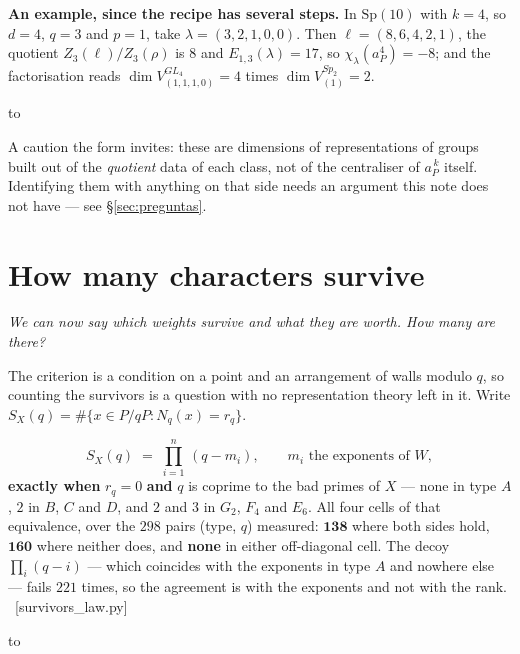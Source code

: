 \documentclass[11pt,a4paper]{article}
\theoremstyle{definition}
\newcommand{\Sp}{\mathrm{Sp}}
\newcommand{\ver}[1]{\unskip\penalty0\ \textcolor{azul}{\small\textsf{[#1]}}}
\newenvironment{keybox}
  {\par\vspace{9pt}\begin{lrbox}{\fichabox}%
   \begin{minipage}{0.90\textwidth}\vspace{7pt}\setlength{\parskip}{3pt}}
  {\vspace{7pt}\end{minipage}\end{lrbox}%
   \par\noindent\hbox to \textwidth{\hfill
   \textcolor{azul}{\rule[-\dp\fichabox]{3.2pt}{\dimexpr\ht\fichabox+\dp\fichabox\relax}}%
   \colorbox{fondoficha}{\usebox{\fichabox}}\hfill}%
   \par\vspace{9pt}}
\begin{document}
\begin{keybox}
\textbf{An example, since the recipe has several steps.} In $\Sp(10)$ with $k=4$, so $d=4$, $q=3$
and $p=1$, take $\lambda=(3,2,1,0,0)$. Then $\ell=(8,6,4,2,1)$, the quotient $Z_3(\ell)/Z_3(\rho)$ is
$8$ and $E_{1,3}(\lambda)=17$, so $\chi_\lambda(a_P^4)=-8$; and the factorisation reads
$\dim V^{GL_4}_{(1,1,1,0)}=4$ times $\dim V^{Sp_2}_{(1)}=2$.
\end{keybox}

\noindent A caution the form invites: these are dimensions of representations of groups built out of
the \emph{quotient} data of each class, not of the centraliser of $a_P^{\,k}$ itself. Identifying
them with anything on that side needs an argument this note does not have --- see
\S\ref{sec:preguntas}.

\section{How many characters survive}\label{sec:cuenta}

\noindent\emph{We can now say which weights survive and what they are worth. How many are there?}

The criterion is a condition on a point and an arrangement of walls modulo $q$, so counting the
survivors is a question with no representation theory left in it. Write
$S_X(q)=\#\{x\in P/qP: N_q(x)=r_q\}$.


\begin{keybox}
\[
S_X(q)\;=\;\prod_{i=1}^{n}\,(q-m_i),\qquad m_i \text{ the exponents of } W,
\]
\textbf{exactly when} $r_q=0$ \textbf{and} $q$ is coprime to the bad primes of $X$ --- none in type
$A$, $2$ in $B$, $C$ and $D$, and $2$ and $3$ in $G_2$, $F_4$ and $E_6$. All four cells of that
equivalence, over the $298$ pairs (type, $q$) measured: $\mathbf{138}$ where both sides hold,
$\mathbf{160}$ where neither does, and \textbf{none} in either off-diagonal cell. The decoy
$\prod_i(q-i)$ --- which coincides with the exponents in type $A$ and nowhere else --- fails $221$
times, so the agreement is with the exponents and not with the rank.
\ver{survivors\_law.py}
\end{keybox}
\end{document}
